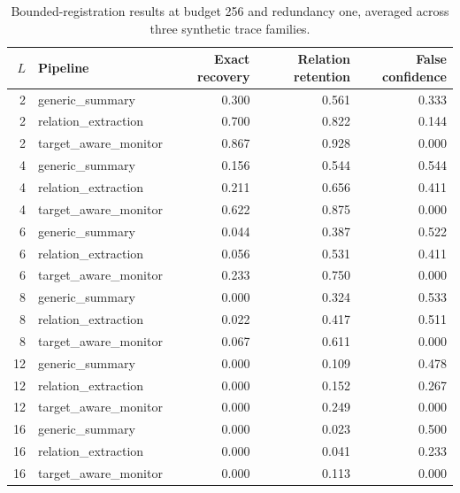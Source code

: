 \begin{table}[p]
\centering
\caption{Bounded-registration results at budget 256 and redundancy one, averaged across three synthetic trace families.}\label{tab:obs}
\small
\begin{tabular}{rlrrr}
\toprule $L$ & Pipeline & Exact recovery & Relation retention & False confidence \\ \midrule
2 & generic\_summary & 0.300 & 0.561 & 0.333 \\
2 & relation\_extraction & 0.700 & 0.822 & 0.144 \\
2 & target\_aware\_monitor & 0.867 & 0.928 & 0.000 \\
4 & generic\_summary & 0.156 & 0.544 & 0.544 \\
4 & relation\_extraction & 0.211 & 0.656 & 0.411 \\
4 & target\_aware\_monitor & 0.622 & 0.875 & 0.000 \\
6 & generic\_summary & 0.044 & 0.387 & 0.522 \\
6 & relation\_extraction & 0.056 & 0.531 & 0.411 \\
6 & target\_aware\_monitor & 0.233 & 0.750 & 0.000 \\
8 & generic\_summary & 0.000 & 0.324 & 0.533 \\
8 & relation\_extraction & 0.022 & 0.417 & 0.511 \\
8 & target\_aware\_monitor & 0.067 & 0.611 & 0.000 \\
12 & generic\_summary & 0.000 & 0.109 & 0.478 \\
12 & relation\_extraction & 0.000 & 0.152 & 0.267 \\
12 & target\_aware\_monitor & 0.000 & 0.249 & 0.000 \\
16 & generic\_summary & 0.000 & 0.023 & 0.500 \\
16 & relation\_extraction & 0.000 & 0.041 & 0.233 \\
16 & target\_aware\_monitor & 0.000 & 0.113 & 0.000 \\
\bottomrule
\end{tabular}
\end{table}

